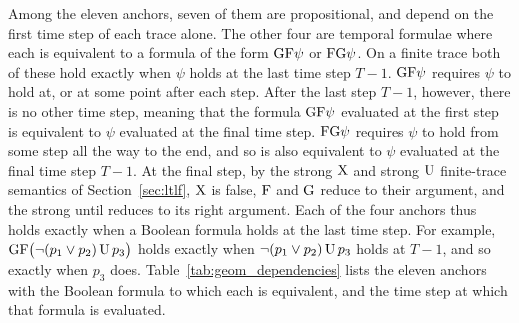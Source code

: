 \documentclass[titlepage,a4paper,11pt]{report}
\begin{document}
    Among the eleven anchors, seven of them are propositional, and depend on the first time step of each trace alone. The other four are temporal formulae where each is equivalent to a formula of the form $\text{G}\text{F}\psi$ or $\text{F}\text{G}\psi$. On a finite trace both of these hold exactly when $\psi$ holds at the last time step $T-1$. $\text{G}\text{F}\psi$ requires $\psi$ to hold at, or at some point after each step. After the last step $T-1$, however, there is no other time step, meaning that the formula $\text{G}\text{F}\psi$ evaluated at the first step is equivalent to $\psi$ evaluated at the final time step. $\text{F}\text{G}\psi$ requires $\psi$ to hold from some step all the way to the end, and so is also equivalent to $\psi$ evaluated at the final time step $T-1$. At the final step, by the strong $\text{X}$ and strong $\text{U}$ finite-trace semantics of Section~\ref{sec:ltlf}, $\text{X}$ is false, $\text{F}$ and $\text{G}$ reduce to their argument, and the strong until reduces to its right argument. Each of the four anchors thus holds exactly when a Boolean formula holds at the last time step. For example, $\text{G}\text{F}\bigl(\neg(p_1\lor p_2)\,\text{U}\,p_3\bigr)$ holds exactly when $\neg(p_1\lor p_2)\,\text{U}\,p_3$ holds at $T-1$, and so exactly when $p_3$ does. Table~\ref{tab:geom_dependencies} lists the eleven anchors with the Boolean formula to which each is equivalent, and the time step at which that formula is evaluated.
\end{document}
